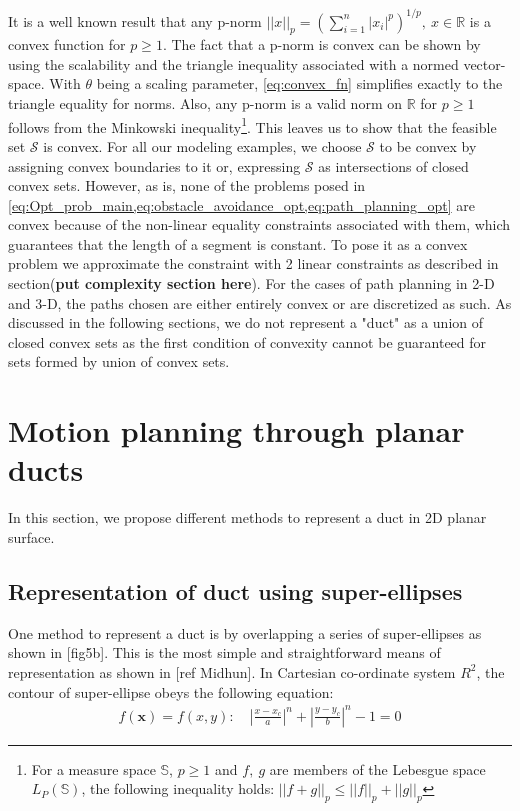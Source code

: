 \documentclass[12pt,a4]{article}
\begin{document}
It is a well known result that any p-norm $||x||_p=(\sum\limits_{i=1}^{n}|x_i|^p)^{1/p},~ x\in \mathbb{R}$ is a convex function for $p\geq 1$. The fact that a p-norm is convex can be shown by using the scalability and the triangle inequality associated with a normed vector-space. With $\theta$  being a scaling parameter, \cref{eq:convex_fn} simplifies exactly to the triangle equality for norms. Also, any p-norm is a valid norm on $\mathbb{R}$ for $p\geq1$ follows from the Minkowski inequality\footnote{For a measure space $\mathbb{S}$, $p\geq 1$ and $f,~g$ are members of the Lebesgue space $L_P(\mathbb{S})$, the following inequality holds: $||f+g||_p\leq ||f||_p+||g||_p$ }. This leaves us to show that the feasible set $\mathcal{S}$ is convex. For all our modeling examples, we choose $\mathcal{S}$ to be convex by assigning convex boundaries to it or, expressing $\mathcal{S}$ as intersections of closed convex sets.  However, as is, none of the problems posed in \cref{eq:Opt_prob_main,eq:obstacle_avoidance_opt,eq:path_planning_opt} are convex because of the non-linear equality constraints associated with them, which guarantees that the length of a segment is constant. To pose it as a convex problem we approximate the constraint with 2 linear constraints as described in section(\textbf{put complexity section here}). For the cases of path planning in 2-D and 3-D, the paths chosen are either entirely convex or are discretized as such. As discussed in the following sections, we do not represent a "duct" as a union of closed convex sets as the first condition of convexity cannot be guaranteed for sets formed by union of convex sets. 





\section{Motion planning through planar ducts}
%
In this section, we propose different methods to represent a duct in 2D planar surface. 
\subsection{Representation of duct using super-ellipses}
%
One method to represent a duct is by overlapping a series of super-ellipses as shown in [fig5b]. This is the most simple and straightforward means of representation as shown in [ref Midhun]. In Cartesian co-ordinate system $R^2$, the contour of super-ellipse obeys the following equation:
\begin{align}
f(\textbf{x})= f(x,y):\quad \left \vert \frac{x-x_c}{a} \right\vert^n+\left\vert \frac{y-y_c}{b} \right\vert^n-1=0
\end{align}
\end{document}
